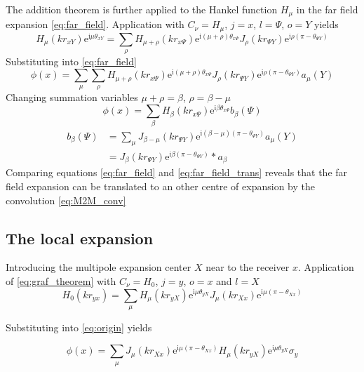 \documentclass[11pt,a4paper]{article}
\newcommand{\ti}{\mathrm{i}}
\newcommand{\te}{\mathrm{e}}
\begin{document}
The addition theorem is further applied to the Hankel function $H_{\mu}$ in
 the far field expansion \eqref{eq:far_field}.
Application with $C_{\nu} = H_{\mu}$, $j = x$, $l = \Psi$, $o = Y$ yields
%
\begin{equation}
	H_{\mu}(k r_{xY})
	\te^{\ti \mu \theta_{xY}}
	=
	\sum_{\rho}
	H_{\mu + \rho}(k r_{x\Psi})
	\te^{\ti (\mu + \rho) \theta_{x\Psi}}
	J_{\rho}(k r_{\Psi Y})
	\te^{\ti \rho(\pi-\theta_{\Psi Y})}
\end{equation}
%
Substituting into \eqref{eq:far_field}
%
\begin{equation}
	\phi(x)
	=
	\sum_{\mu}
	\sum_{\rho}
	H_{\mu + \rho}(k r_{x\Psi})
	\te^{\ti (\mu + \rho) \theta_{x\Psi}}
	J_{\rho}(k r_{\Psi Y})
	\te^{\ti \rho(\pi-\theta_{\Psi Y})}
	a_{\mu}(Y)
\end{equation}
%  
Changing summation variables $\mu + \rho = \beta$, $\rho = \beta - \mu$
%
\begin{equation}
	\phi(x)
	=
	\sum_{\beta}
	H_{\beta}(k r_{x\Psi})
	\te^{\ti \beta \theta_{x\Psi}}
	b_{\beta}(\Psi)
	\label{eq:far_field_trans}
\end{equation}
%
\begin{align}
	b_{\beta}(\Psi)
	&=
	\sum_{\mu}
	J_{\beta - \mu}(k r_{\Psi Y})
	\te^{\ti (\beta - \mu)(\pi-\theta_{\Psi Y})}
	a_{\mu}(Y) \\
	&=
	J_{\beta}(k r_{\Psi Y})
	\te^{\ti \beta (\pi-\theta_{\Psi Y})}
	\ast
	a_{\beta} \label{eq:M2M_conv}
\end{align}
%
Comparing equations \eqref{eq:far_field} and \eqref{eq:far_field_trans} reveals
 that the far field expansion can be translated to an other centre of expansion 
 by the convolution \eqref{eq:M2M_conv}

\subsection{The local expansion}

Introducing the multipole expansion center $X$ near to the receiver $x$.
Application of \eqref{eq:graf_theorem} with $C_{\nu} = H_0$, $j = y$, $o = x$
 and $l = X$
%
\begin{equation}
	H_{0}(k r_{yx})
	=
	\sum_{\mu} H_{\mu}(k r_{yX})
	\te^{\ti \mu \theta_{yX}}
	J_{\mu}(k r_{Xx})
	\te^{\ti \mu(\pi-\theta_{Xx})}
\end{equation}

Substituting into \eqref{eq:origin} yields

\begin{equation}
	\phi(x)
	=
	\sum_{\mu}
	J_{\mu}(k r_{Xx})
	\te^{\ti \mu(\pi-\theta_{Xx})}
	H_{\mu}(k r_{yX})
	\te^{\ti \mu \theta_{yX}}
	\sigma_y
\end{equation}
\end{document}
